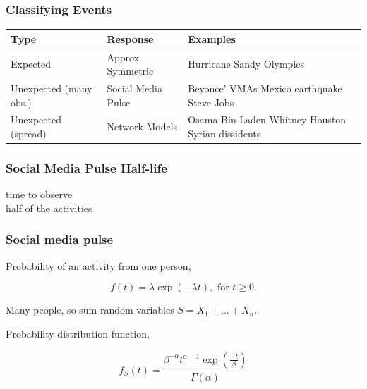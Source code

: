 \documentclass{beamer}
\begin{document}
\begin{frame}\frametitle{Classifying Events}
\begin{table}
\begin{tabular}{ m{2cm} | m{ 2.5cm} | m{4cm}}
\hline
Type & Response & Examples \\ \hline
Expected    & Approx. \newline Symmetric & Hurricane Sandy \newline Olympics \\ \hline
Unexpected (many obs.) & Social Media \newline Pulse & Beyonce' VMAs \newline  Mexico earthquake \newline  Steve Jobs \\ \hline
Unexpected (spread) & Network \newline Models & Osama Bin Laden \newline  Whitney Houston \newline  Syrian dissidents \\ \hline
\end{tabular}
\end{table}
\end{frame}


\begin{frame}\frametitle{Social Media Pulse Half-life}
\begin{center}
{\Huge time to observe \\[10pt] half of the activities}
\end{center}
\end{frame}

\begin{frame}
\frametitle{Social media pulse} 
Probability of an activity from one person,

\begin{equation*}
f(t) = \lambda \exp(-\lambda t), \text{ for } t \geq 0.
\end{equation*}

Many people, so sum random variables $S = X_1 + \ldots + X_{n}$.

Probability distribution function,

\begin{equation*}
f_S(t) = \frac{ \beta^{-\alpha} t^{\alpha-1} \exp( \frac{-t}{\beta}) } {\Gamma(\alpha)}
\end{equation*}

%
\end{frame}
\end{document}
